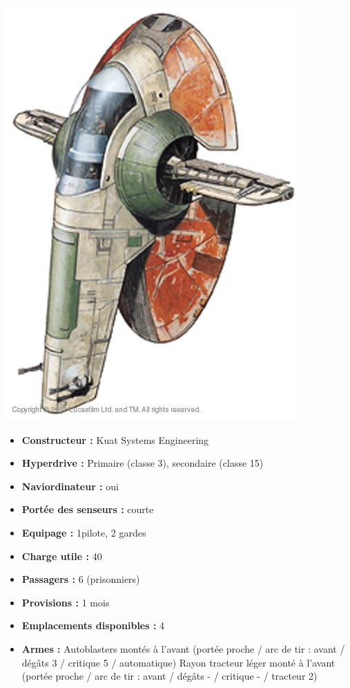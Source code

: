 \documentclass[twoside]{article}
\begin{document}
\noindent\begin{minipage}{0.3\textwidth}
	\includegraphics[width=1\linewidth]{../img/species/firespray}
\end{minipage}%
\hfill%
\begin{minipage}{0.7\textwidth}\raggedleft
	\begin{itemize}
		\item \textbf{Constructeur :} Kuat Systems Engineering
		\item \textbf{Hyperdrive :} Primaire (classe 3), secondaire (classe 15)
		\item \textbf{Naviordinateur :} oui
		\item \textbf{Portée des senseurs :} courte
		\item \textbf{Equipage :} 1pilote, 2 gardes
		\item \textbf{Charge utile :} 40
		\item \textbf{Passagers :} 6 (prisonniers)
		\item \textbf{Provisions :} 1 mois 
		\item \textbf{Emplacements disponibles :} 4
		\item \textbf{Armes :} Autoblasters montés à l'avant (portée proche / arc de tir : avant / dégâts 3 / critique 5 / automatique) Rayon tracteur léger monté à l'avant (portée proche / arc de tir : avant / dégâts - / critique - / tracteur 2)
	\end{itemize}
\end{minipage}
\end{document}
